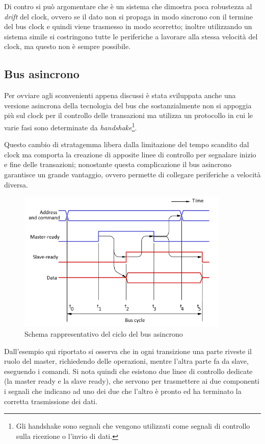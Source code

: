 \documentclass[class=book, crop=false, oneside]{standalone}
\begin{document}
Di contro si può argomentare che è un sistema che dimostra poca robustezza al \emph{drift} del clock, ovvero se il dato non si propaga in modo sincrono con il  termine del bus clock e quindi viene trasmesso in modo scorretto; inoltre utilizzando un sistema simile si costringono tutte le periferiche a lavorare alla stessa velocità del clock, ma questo non è sempre possibile.

\subsection{Bus asincrono}
Per ovviare agli sconvenienti appena discussi è stata sviluppata anche una versione asincrona della tecnologia del bus che sostanzialmente non si appoggia più sul clock per il controllo delle transazioni ma utilizza un protocollo in cui le varie fasi sono determinate da \emph{handshake}\footnote{Gli handshake sono segnali che vengono utilizzati come segnali di controllo sulla ricezione o l'invio di dati.}.

Questo cambio di stratagemma libera dalla limitazione del tempo scandito dal clock ma comporta la creazione di apposite linee di controllo per segnalare inizio e fine delle transazioni;
nonostante questa complicazione il bus asincrono garantisce un grande vantaggio, ovvero permette di collegare periferiche a velocità diversa.

\begin{figure}[H]
	\centering
	\includegraphics[width=0.9\textwidth,keepaspectratio]{bus-asincrono}
	\caption{Schema rappresentativo del ciclo del bus asincrono}
\end{figure}

Dall'esempio qui riportato si osserva che in ogni transizione una parte riveste il ruolo del master, richiedendo delle operazioni, mentre l'altra parte fa da slave, eseguendo i comandi.
Si nota quindi che esistono due linee di controllo dedicate (la master ready e la slave ready), che servono per trasmettere ai due componenti i segnali che indicano ad uno dei due che l'altro è pronto ed ha terminato la corretta trasmissione dei dati.
\end{document}
